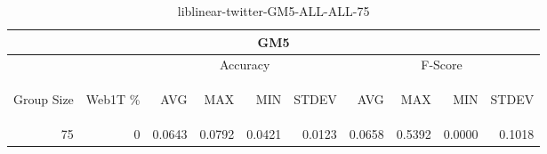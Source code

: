 \begin{center}
\begin{table}[htbp]
\begin{tabular}{ | r | r | r | r | r | r | r | r | r | r |}
\hline
\multicolumn{10}{|c|}{GM5}\\
\hline
 & & \multicolumn{4}{|c|}{Accuracy} & \multicolumn{4}{|c|}{F-Score}\\ \cline{3-10}
\begin{sideways}Group Size\end{sideways} & \begin{sideways}Web1T \%\end{sideways} & \begin{sideways}AVG\end{sideways} & \begin{sideways}MAX\end{sideways} & \begin{sideways}MIN\end{sideways} & \begin{sideways}STDEV\end{sideways} & \begin{sideways}AVG\end{sideways} & \begin{sideways}MAX\end{sideways} & \begin{sideways}MIN\end{sideways} & \begin{sideways}STDEV\end{sideways}\\
\hline
\multirow{0}{*}{75}
 & 0 & 0.0643 & 0.0792 & 0.0421 & 0.0123 & 0.0658 & 0.5392 & 0.0000 & 0.1018\\ \cline{2-10}
\hline
\end{tabular}
\caption{liblinear-twitter-GM5-ALL-ALL-75}
\label{table:liblinear-twitter-GM5-ALL-ALL-75}
\end{table}
\end{center}

